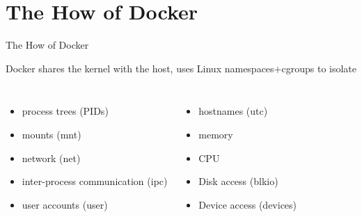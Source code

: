 \documentclass[xcolor=dvipsnames]{beamer}
\begin{document}
\section{The How of Docker}
\begin{frame}{The How of Docker}

Docker shares the kernel with the host, uses Linux namespaces+cgroups to isolate
  \begin{columns}
    \begin{itemize}
    \item process trees (PIDs)
    \item mounts (mnt)
    \item network  (net)
    \item inter-process communication (ipc)
    \item user accounts (user)
    \end{itemize}
    \begin{itemize}
    \item hostnames (utc)
    \item memory 
    \item CPU
    \item Disk access (blkio)
    \item Device access (devices)
    \end{itemize}
  \end{columns}

\end{frame}
  
\end{document}
